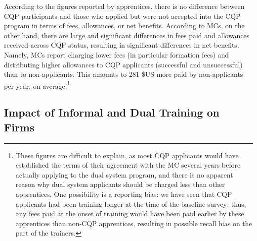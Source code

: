 \documentclass[
  a4paper, twoside, 12pt]{book}
\begin{document}
According to the figures reported by apprentices, there is no difference between CQP participants and those who applied but were not accepted into the CQP program in terms of fees, allowances, or net benefits. According to MCs, on the other hand, there are large and significant differences in fees paid and allowances received across CQP status, resulting in significant differences in net benefits. Namely, MCs report charging lower fees (in particular formation fees) and distributing higher allowances to CQP applicants (successful and unsuccessful) than to non-applicants. This amounts to 281 \$US more paid by non-applicants per year, on average.\footnote{These figures are difficult to explain, as most CQP applicants would have established the terms of their agreement with the MC several years before actually applying to the dual system program, and there is no apparent reason why dual system applicants should be charged less than other apprentices. One possibility is a reporting bias: we have seen that CQP applicants had been training longer at the time of the baseline survey: thus, any fees paid at the onset of training would have been paid earlier by these apprentices than non-CQP apprentices, resulting in possible recall bias on the part of the trainers.}

\hypertarget{firmimpact}{%
\subsection{Impact of Informal and Dual Training on Firms}\label{firmimpact}}
\end{document}
